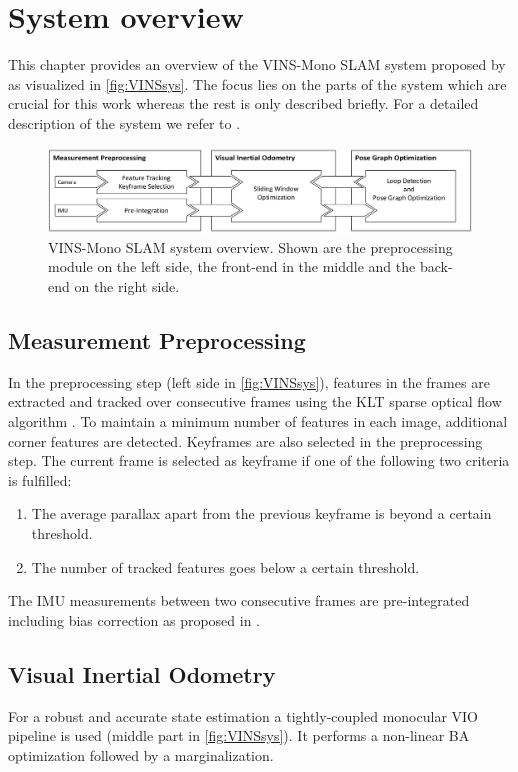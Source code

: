 \chapter{System overview}
\label{ch:sysOverview}
This chapter provides an overview of the VINS-Mono SLAM system proposed by  
\citep{Qin2017VINS} as visualized in \autoref{fig:VINSsys}. The focus lies on 
the parts of the system which are crucial for this work whereas the rest is 
only described briefly. For a detailed description of the system we refer to 
\citep{Qin2017VINS}.

\begin{figure}[h!]
  \centering
  \includegraphics[width=1\textwidth]{images/system.png}
  \caption{VINS-Mono SLAM system overview. Shown are the preprocessing module 
on the left side, the front-end in the middle and the back-end on the right 
side.}
  \label{fig:VINSsys}
\end{figure}

\section{Measurement Preprocessing}
\label{sec:measPreprocess}
In the preprocessing step (left side in \autoref{fig:VINSsys}), features 
in the frames are extracted and tracked 
over consecutive frames using the KLT sparse optical flow algorithm 
\cite{lucas1981}. To maintain a minimum number of features in each image, 
additional corner features are detected. Keyframes are also selected in the 
preprocessing step. The current frame is selected as keyframe if one of the 
following two criteria is fulfilled: 
\begin{enumerate}
  \item The average parallax apart from the previous keyframe is beyond a certain threshold.
  \item The number of tracked features goes below a certain threshold.
\end{enumerate}

The \ac{IMU} measurements between two consecutive frames are pre-integrated  
including bias correction as proposed in \citep{Forster2017Manifold}. 

\section{Visual Inertial Odometry}
For a robust and accurate state estimation a tightly-coupled monocular \ac{VIO} 
pipeline is used (middle part in \autoref{fig:VINSsys}). It performs a 
non-linear \ac{BA} optimization followed by a marginalization.

